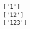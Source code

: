\documentclass[11pt]{article}
\begin{document}
    \begin{Verbatim}[commandchars=\\\{\}]
['1']
['12']
['123']

    \end{Verbatim}


    
    
    
    
\end{document}
